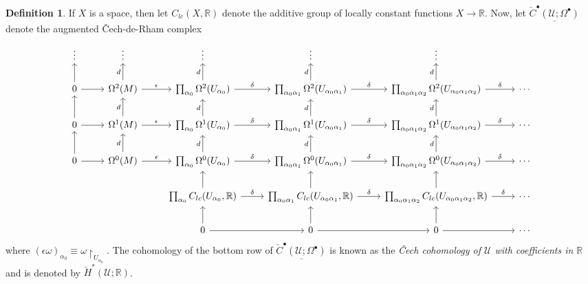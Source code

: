 \documentclass[10pt,letterpaper,cm]{nupset}
\theoremstyle{definition}
\newtheorem{definition}{Definition}[subsection]
\theoremstyle{theorem}
\theoremstyle{remark}
\newcommand{\U}{\mathcal U}
\newcommand{\R}{\mathbb{R}}
\newcommand{\1}{\mathbb{1}}
\newcommand{\0}{\vec 0}
\begin{document}
\begin{definition}
If $X$ is a space, then let $C_{lc}(X, \R)$ denote the additive group of locally constant functions $X \to \R$. Now, let  $\underline{\check{C}^{\bullet}(\U; \Omega^{\bullet})}$ denote the augmented \v{C}ech-de-Rham complex
\[
\begin{tikzcd}
\vdots                & \vdots                                           & \vdots                                                                    & \vdots                                                                                        & \vdots                                                                                                            &        \\
0 \arrow[r] \arrow[u] & \Omega^2(M) \arrow[r, "\epsilon"] \arrow[u, "d"] & \prod_{\alpha_0}\Omega^2(U_{\alpha_0}) \arrow[u, "d"] \arrow[r, "\delta"] & \prod_{\alpha_0{\alpha_1}}\Omega^2(U_{\alpha_0{\alpha_1}}) \arrow[u, "d"] \arrow[r, "\delta"] & \prod_{\alpha_0{\alpha_1{\alpha_2}}}\Omega^2(U_{\alpha_0{\alpha_1{\alpha_2}}}) \arrow[u, "d"] \arrow[r, "\delta"] & \cdots \\
0 \arrow[r] \arrow[u] & \Omega^1(M) \arrow[r, "\epsilon"] \arrow[u, "d"] & \prod_{\alpha_0}\Omega^1(U_{\alpha_0}) \arrow[u, "d"] \arrow[r, "\delta"] & \prod_{\alpha_0{\alpha_1}}\Omega^1(U_{\alpha_0{\alpha_1}}) \arrow[u, "d"] \arrow[r, "\delta"] & \prod_{\alpha_0{\alpha_1{\alpha_2}}}\Omega^1(U_{\alpha_0{\alpha_1{\alpha_2}}}) \arrow[u, "d"] \arrow[r, "\delta"] & \cdots \\
0 \arrow[r] \arrow[u] & \Omega^0(M) \arrow[r, "\epsilon"] \arrow[u, "d"] & \prod_{\alpha_0}\Omega^0(U_{\alpha_0}) \arrow[r, "\delta"] \arrow[u, "d"] & \prod_{\alpha_0{\alpha_1}}\Omega^0(U_{\alpha_0{\alpha_1}}) \arrow[r, "\delta"] \arrow[u, "d"] & \prod_{\alpha_0{\alpha_1{\alpha_2}}}\Omega^0(U_{\alpha_0{\alpha_1{\alpha_2}}}) \arrow[r, "\delta"] \arrow[u, "d"] & \cdots \\
                      &                                                  & {\prod_{\alpha_0}C_{lc}(U_{\alpha_0}, \R)} \arrow[r, "\delta"] \arrow[u]  & {\prod_{\alpha_0{\alpha_1}}C_{lc}(U_{\alpha_0{\alpha_1}}, \R)} \arrow[r, "\delta"] \arrow[u]  & {\prod_{\alpha_0{\alpha_1{\alpha_2}}}C_{lc}(U_{\alpha_0{\alpha_1{\alpha_2}}}, \R)} \arrow[r, "\delta"] \arrow[u]  & \cdots \\
                      &                                                  & 0 \arrow[u] \arrow[r]                                                     & 0 \arrow[u] \arrow[r]                                                                         & 0 \arrow[u] \arrow[r]                                                                                             & \cdots
\end{tikzcd}
\] where $\left(\epsilon{\omega}\right)_{\alpha_0} \equiv \omega \restriction_{U_{\alpha_0}}$. The cohomology of the bottom row of $\underline{\check{C}^{\bullet}(\U; \Omega^{\bullet})}$  is known as the \textit{\v{C}ech cohomology of $\U$ with coefficients in $\R$} and is denoted by $\check{H}^{\ast}(\U; \R)$.
\end{definition}
\end{document}
